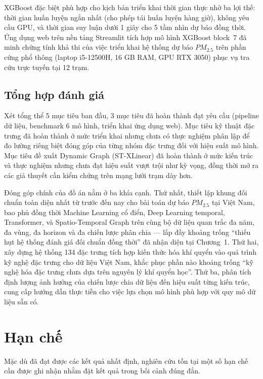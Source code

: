XGBoost đặc biệt phù hợp cho kịch bản triển khai thời gian thực nhờ ba lợi thế: thời gian huấn luyện ngắn nhất (cho phép tái huấn luyện hàng giờ), không yêu cầu GPU, và thời gian suy luận dưới 1 giây cho 5 tầm nhìn dự báo đồng thời. Ứng dụng web trên nền tảng Streamlit tích hợp mô hình XGBoost block~7 đã minh chứng tính khả thi của việc triển khai hệ thống dự báo $PM_{2.5}$ trên phần cứng phổ thông (laptop i5-12500H, 16 GB RAM, GPU RTX 3050) phục vụ tra cứu trực tuyến tại 12 trạm.

\subsection{Tổng hợp đánh giá}

Xét tổng thể 5 mục tiêu ban đầu, 3 mục tiêu đã hoàn thành đạt yêu cầu (pipeline dữ liệu, benchmark 6 mô hình, triển khai ứng dụng web). Mục tiêu kỹ thuật đặc trưng đã hoàn thành ở mức triển khai nhưng chưa có thực nghiệm phân lập để đo lường riêng biệt đóng góp của từng nhóm đặc trưng đối với hiệu suất mô hình. Mục tiêu đề xuất Dynamic Graph (ST-XLinear) đã hoàn thành ở mức kiến trúc và thực nghiệm nhưng chưa đạt hiệu suất vượt trội như kỳ vọng, đồng thời mở ra các giả thuyết cần kiểm chứng trên mạng lưới trạm dày hơn.

Đóng góp chính của đồ án nằm ở ba khía cạnh. Thứ nhất, thiết lập khung đối chuẩn toàn diện nhất từ trước đến nay cho bài toán dự báo $PM_{2.5}$ tại Việt Nam, bao phủ đồng thời Machine Learning cổ điển, Deep Learning temporal, Transformer, và Spatio-Temporal Graph trên cùng bộ dữ liệu quan trắc đa năm, đa vùng, đa horizon và đa chiến lược phân chia --- lấp đầy khoảng trống ``thiếu hụt hệ thống đánh giá đối chuẩn đồng thời'' đã nhận diện tại Chương~1. Thứ hai, xây dựng hệ thống 134 đặc trưng tích hợp kiến thức hóa khí quyển vào quá trình kỹ nghệ đặc trưng cho dữ liệu Việt Nam, khắc phục phần nào khoảng trống ``kỹ nghệ hóa đặc trưng chưa dựa trên nguyên lý khí quyển học''. Thứ ba, phân tích định lượng ảnh hưởng của chiến lược chia dữ liệu đến hiệu suất từng kiến trúc, cung cấp hướng dẫn thực tiễn cho việc lựa chọn mô hình phù hợp với quy mô dữ liệu sẵn có.

\section{Hạn chế}

Mặc dù đã đạt được các kết quả nhất định, nghiên cứu tồn tại một số hạn chế cần được ghi nhận nhằm đặt kết quả trong bối cảnh đúng đắn.

